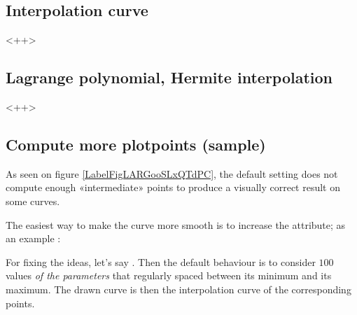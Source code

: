 \subsection{Interpolation curve}

<++>

\subsection{Lagrange polynomial, Hermite interpolation}

<++>

\subsection{Compute more plotpoints (sample)}

As seen on figure \ref{LabelFigLARGooSLxQTdPC}, the default setting does not compute enough «intermediate» points to produce a visually correct result on some curves.

The easiest way to make the curve more smooth is to increase the  attribute; as an example :



For fixing the ideas, let's say . Then the default behaviour is to consider \( 100\) values \emph{of the parameters} that regularly spaced between its minimum and its maximum. The drawn curve is then the interpolation curve of the corresponding points.

